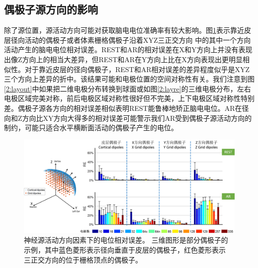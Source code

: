 \subsection{偶极子源方向的影响}
除了源位置，源活动方向可能对获取脑电电位准确率有较大影响。图\ref{2:orie}表示靠近皮层径向活动的偶极子或者体素栅格偶极子沿着XYZ三正交方向
中的其中一个方向活动产生的脑电电位相对误差。REST和AR的相对误差在X和Y方向上并没有表现出像Z方向上的相当大差异，但REST和AR在Y方向上比在X方向表现出更明显相似性。对于靠近皮层的径向偶极子，REST和AR相对误差的差异程度似乎是XYZ三个方向上差异的折中。该结果可能和电极位置的空间对称性有关。我们注意到图\ref{2:layout}中如果把二维电极分布转换到球面或如图\ref{2:layre}的三维电极分布，左右电极区域完美对称，前后电极区域对称性很好但不完美，上下电极区域对称性特别差。偶极子源各方向的相对误差相似表明REST能鲁棒地矫正脑电电位。AR在径向和Z方向比XY方向大得多的相对误差可能警示我们AR受到偶极子源活动方向的制约，可能只适合水平横断面活动的偶极子产生的电位。
\begin{figure}[h!]
	\centering
	\includegraphics[width=15cm]{pic/JNE/figure7.png}
	\caption{神经源活动方向因素下的电位相对误差。 三维图形是部分偶极子的示例，其中蓝色菱形表示径向垂直于皮层的偶极子，红色菱形表示
	三正交方向的位于栅格顶点的偶极子。}
	\label{2:orie}
\end{figure}

